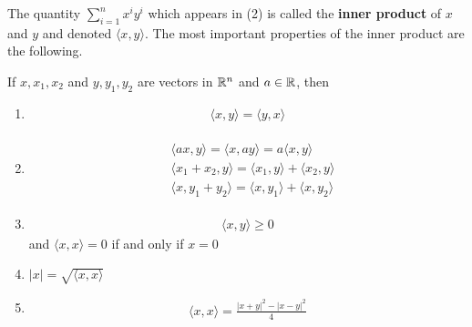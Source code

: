 The quantity $\sum_{i=1 }^{n }{x^iy^i}$ which appears in (2) is called the 
\textbf{inner product} of $x$ and $y$ and denoted $\langle x, y\rangle$.
The most important properties of the inner product are the following.


\begin{theorem}
    If $x, x_1, x_2$ and $y, y_1, y_2$ are vectors in $\mathbb{R}^n$ and 
    $a\in \mathbb{R}$, then 
    \begin{enumerate}[label={\upshape(\arabic*)}]
        \item {}
            \begin{align*}
                \langle x, y\rangle = \langle y, x\rangle
            \end{align*}
        \item {}
            \begin{align*}\begin{aligned}
                & \langle ax, y\rangle = \langle x, ay\rangle = a\langle x, y\rangle\\
                & \langle x_1+x_2, y\rangle = \langle x_1, y\rangle + \langle x_2, y\rangle \\
                & \langle x, y_1+y_2\rangle = \langle x, y_1\rangle + \langle x, y_2\rangle
            \end{aligned}\end{align*}
        \item {}
            \begin{align*}
                \langle x, y\rangle\ge 0
            \end{align*}    
            and $\langle x, x\rangle = 0$ if and only if $x=0$
        \item $|x| = \sqrt{\langle x, x\rangle}$
        \item {}
            \begin{align*}
                \langle x, x\rangle = \frac{|x+y|^2 - |x-y|^2}{4}
            \end{align*}
    \end{enumerate} 
\end{theorem}

